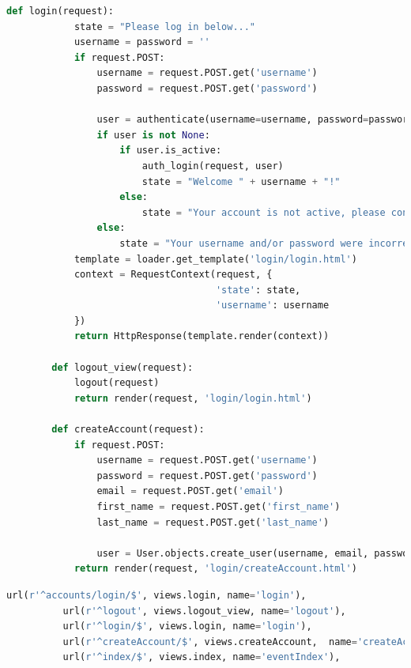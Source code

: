 \documentclass[draftclsnofoot,10pt,onecolumn]{IEEEtran} %
\begin{document}
\newpage

\begin{center}
\captionsetup{width=.5\linewidth}
  \begin{lstlisting}[caption=Views.py file that handles the creation of accounts and the login page view, language=Python]
        def login(request):
            state = "Please log in below..."
            username = password = ''
            if request.POST:
                username = request.POST.get('username')
                password = request.POST.get('password')

                user = authenticate(username=username, password=password)
                if user is not None:
                    if user.is_active:
                        auth_login(request, user)
                        state = "Welcome " + username + "!"
                    else:
                        state = "Your account is not active, please contact the site admin."
                else:
                    state = "Your username and/or password were incorrect."
            template = loader.get_template('login/login.html')
            context = RequestContext(request, {
                                     'state': state,
                                     'username': username
            })
            return HttpResponse(template.render(context))

        def logout_view(request):
            logout(request)
            return render(request, 'login/login.html')

        def createAccount(request):
            if request.POST:
                username = request.POST.get('username')
                password = request.POST.get('password')
                email = request.POST.get('email')
                first_name = request.POST.get('first_name')
                last_name = request.POST.get('last_name')

                user = User.objects.create_user(username, email, password)
            return render(request, 'login/createAccount.html')
      \end{lstlisting}
    \end{center}

    \begin{center}
    \captionsetup{width=.5\linewidth}
        \begin{lstlisting}[caption=urls.py file where the destinations are stored for login and logout, language=Python]
          url(r'^accounts/login/$', views.login, name='login'),
          url(r'^logout', views.logout_view, name='logout'),
          url(r'^login/$', views.login, name='login'),
          url(r'^createAccount/$', views.createAccount,  name='createAccount'),
          url(r'^index/$', views.index, name='eventIndex'),
      \end{lstlisting}
    \end{center}
\end{document}
